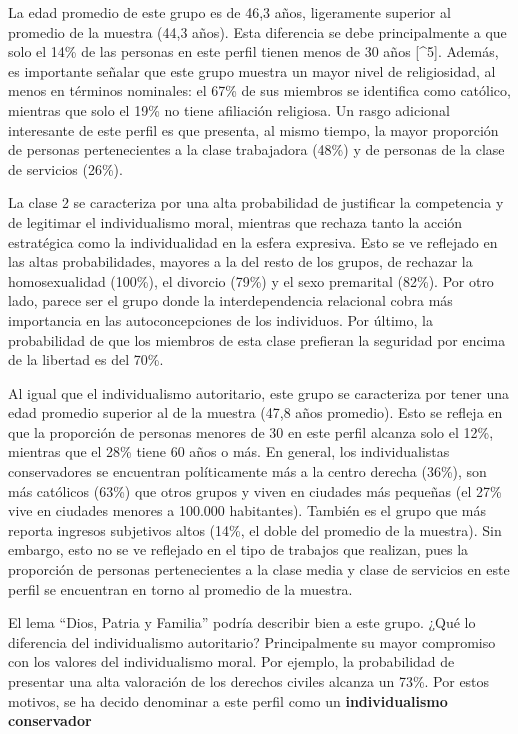 \documentclass[12pt,twoside]{templates/facsothesis}
\begin{document}
La edad promedio de este grupo es de 46,3 años, ligeramente superior al promedio de la muestra (44,3 años). Esta diferencia se debe principalmente a que solo el 14\% de las personas en este perfil tienen menos de 30 años {[}\^{}5{]}. Además, es importante señalar que este grupo muestra un mayor nivel de religiosidad, al menos en términos nominales: el 67\% de sus miembros se identifica como católico, mientras que solo el 19\% no tiene afiliación religiosa. Un rasgo adicional interesante de este perfil es que presenta, al mismo tiempo, la mayor proporción de personas pertenecientes a la clase trabajadora (48\%) y de personas de la clase de servicios (26\%).

La clase 2 se caracteriza por una alta probabilidad de justificar la competencia y de legitimar el individualismo moral, mientras que rechaza tanto la acción estratégica como la individualidad en la esfera expresiva. Esto se ve reflejado en las altas probabilidades, mayores a la del resto de los grupos, de rechazar la homosexualidad (100\%), el divorcio (79\%) y el sexo premarital (82\%). Por otro lado, parece ser el grupo donde la interdependencia relacional cobra más importancia en las autoconcepciones de los individuos. Por último, la probabilidad de que los miembros de esta clase prefieran la seguridad por encima de la libertad es del 70\%.

Al igual que el individualismo autoritario, este grupo se caracteriza por tener una edad promedio superior al de la muestra (47,8 años promedio). Esto se refleja en que la proporción de personas menores de 30 en este perfil alcanza solo el 12\%, mientras que el 28\% tiene 60 años o más. En general, los individualistas conservadores se encuentran políticamente más a la centro derecha (36\%), son más católicos (63\%) que otros grupos y viven en ciudades más pequeñas (el 27\% vive en ciudades menores a 100.000 habitantes). También es el grupo que más reporta ingresos subjetivos altos (14\%, el doble del promedio de la muestra). Sin embargo, esto no se ve reflejado en el tipo de trabajos que realizan, pues la proporción de personas pertenecientes a la clase media y clase de servicios en este perfil se encuentran en torno al promedio de la muestra.

El lema ``Dios, Patria y Familia'' podría describir bien a este grupo. ¿Qué lo diferencia del individualismo autoritario? Principalmente su mayor compromiso con los valores del individualismo moral. Por ejemplo, la probabilidad de presentar una alta valoración de los derechos civiles alcanza un 73\%. Por estos motivos, se ha decido denominar a este perfil como un \textbf{individualismo conservador}
\end{document}
